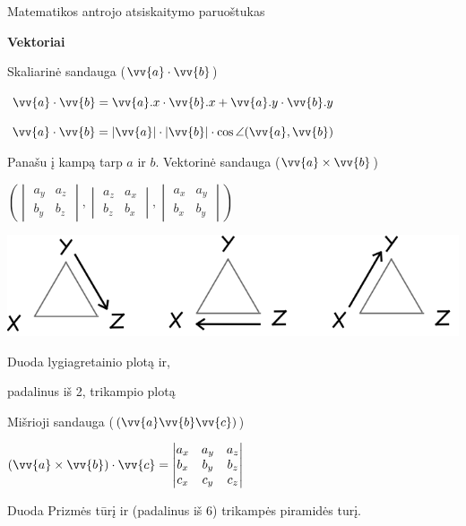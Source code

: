 \documentclass[fleqn]{article} %
\begin{document}
\renewcommand{\tablename}{Lentelė}
\renewcommand{\figurename}{Iliustracija}
\renewcommand{\vec}{\vv}
\pagestyle{plain}
\texttt{}

\begin{center} {\Large Matematikos antrojo atsiskaitymo paruoštukas} \end{center}

\begin{center} \textbf{Vektoriai} \end{center}
\begin{multicols}{3}
    Skaliarinė sandauga ($\vec{a}\cdot\vec{b}$)

    $\vec{a}\cdot\vec{b} = \vec{a}.x\cdot\vec{b}.x  + \vec{a}.y\cdot\vec{b}.y$

    $\vec{a}\cdot\vec{b} = |\vec{a}|\cdot|\vec{b}|\cdot\cos\angle(\vec{a}, \vec{b})$ 

    Panašu į kampą tarp $a$ ir $b$.
    \vfill\null
    \columnbreak
    Vektorinė sandauga ($\vec{a}\times\vec{b}$)

    $\left(
    \begin{vmatrix} a_y & a_z \\ b_y & b_z \end{vmatrix},
    \begin{vmatrix} a_z & a_x \\ b_z & b_x \end{vmatrix},
    \begin{vmatrix} a_x & a_y \\ b_x & b_y \end{vmatrix}
    \right)$ 

    \includegraphics[scale=0.25]{assets/vektorine-daugyba.png}

    Duoda lygiagretainio plotą ir,

    padalinus iš 2, trikampio plotą

    \vfill\null
    \columnbreak
    Mišrioji sandauga ($(\vec{a}\vec{b}\vec{c})$)

    $(\vec{a}\times\vec{b})\cdot\vec{c} = \begin{vmatrix} a_x & a_y & a_z \\ b_x & b_y & b_z \\ c_x & c_y & c_z \end{vmatrix}$

    Duoda Prizmės tūrį ir 
    (padalinus iš 6)  
    trikampės piramidės turį.

\end{multicols}
\end{document}

